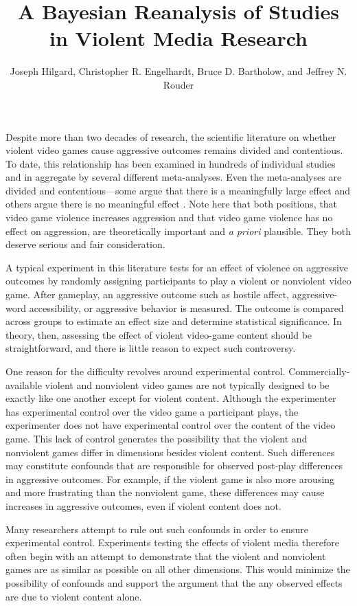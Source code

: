 \documentclass[man]{apa6}
\author{Joseph Hilgard, Christopher R. Engelhardt, Bruce D. Bartholow, and Jeffrey N. Rouder}
\title{A Bayesian Reanalysis of Studies in Violent Media Research}
\affiliation{University of Missouri - Columbia}
\begin{document}
\maketitle

Despite more than two decades of research, the scientific literature on whether violent video games cause aggressive outcomes remains divided and contentious. To date, this relationship has been examined in hundreds of individual studies and in aggregate by several different meta-analyses. Even the meta-analyses are divided and contentious---some argue that there is a meaningfully large effect \citep{Anderson:etal:2010,Greitemeyer:Mugge:2014} and others argue there is no meaningful effect \citep[e.g.,][]{Ferguson:Kilburn:2009,Sherry:2001}. Note here that both positions, that video game violence increases aggression and that video game violence has no effect on aggression, are theoretically important and {\em a priori} plausible.  They both deserve serious and fair consideration. 

A typical experiment in this literature tests for an effect of violence on aggressive outcomes by randomly assigning participants to play a violent or nonviolent video game. After gameplay, an aggressive outcome such as hostile affect, aggressive-word accessibility, or aggressive behavior is measured. The outcome is compared across groups to estimate an effect size and determine statistical significance.  In theory, then, assessing the effect of violent video-game content should be straightforward, and there is little reason to expect such controversy.

One reason for the difficulty revolves around experimental control.  Commercially-available violent and nonviolent video games are not typically designed to be exactly like one another except for violent content. Although the experimenter has experimental control over the video game a participant plays, the experimenter does not have experimental control over the content of the video game. This lack of control generates the possibility that the violent and nonviolent games differ in dimensions besides violent content. Such differences may constitute confounds that are responsible for observed post-play differences in aggressive outcomes. For example, if the violent game is also more arousing and more frustrating than the nonviolent game, these differences may cause increases in aggressive outcomes, even if violent content does not. 

Many researchers attempt to rule out such confounds in order to ensure experimental control. Experiments testing the effects of violent media therefore often begin with an attempt to demonstrate that the violent and nonviolent games are as similar as possible on all other dimensions. This would minimize the possibility of confounds and support the argument that the any observed effects are due to violent content alone.
\end{document}
